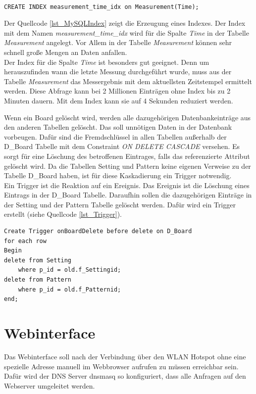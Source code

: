 \begin{lstlisting}[caption={MySQL Index},label=lst_MySQLIndex]

CREATE INDEX measurement_time_idx on Measurement(Time);

\end{lstlisting}


Der Quellcode \ref{lst_MySQLIndex} zeigt die Erzeugung eines Indexes. Der Index mit dem Namen \textit{measurement\_time\_idx} wird für die Spalte \textit{Time} in der Tabelle \textit{Measurement} angelegt. Vor Allem in der Tabelle \textit{Measurement} können sehr schnell große Mengen an Daten anfallen.\\
Der Index für die Spalte \textit{Time} ist besonders gut geeignet. Denn um herauszufinden wann die letzte Messung durchgeführt wurde, muss aus der Tabelle \textit{Measurement} das Messergebnis mit dem aktuellsten Zeitstempel ermittelt werden. Diese Abfrage kann bei 2 Millionen Einträgen ohne Index bis zu  2 Minuten dauern. Mit dem Index kann sie auf 4 Sekunden reduziert werden.\ 

Wenn ein Board gelöscht wird, werden alle dazugehörigen Datenbankeinträge aus den anderen Tabellen gelöscht. Das soll unnötigen Daten in der Datenbank vorbeugen. Dafür sind die Fremdschlüssel in allen Tabellen außerhalb der D\_Board Tabelle mit dem Constraint \textit{ON DELETE CASCADE} versehen. Es sorgt für eine Löschung des betroffenen Eintrages, falls das referenzierte Attribut gelöscht wird. Da die Tabellen Setting und Pattern keine eigenen Verweise zu der Tabelle D\_Board haben, ist für diese Kaskadierung ein Trigger notwendig. \\
Ein Trigger ist die Reaktion auf ein Ereignis. Das Ereignis ist die Löschung eines Eintrags in der D\_Board Tabelle. Daraufhin sollen die dazugehörigen Einträge in der Setting und der Pattern Tabelle gelöscht werden. Dafür wird ein Trigger erstellt (siehe Quellcode \ref{lst_Trigger}).\\

\begin{lstlisting}[caption={onBoardDelete Trigger},label=lst_Trigger]
Create Trigger onBoardDelete before delete on D_Board 
for each row 
Begin 
delete from Setting 
	where p_id = old.f_Settingid;
delete from Pattern 
	where p_id = old.f_Patternid;
end;
\end{lstlisting}



\newpage
\section{Webinterface}
Das Webinterface soll nach der Verbindung über den WLAN Hotspot ohne eine spezielle Adresse manuell im Webbrowser aufrufen zu müssen erreichbar sein. Dafür wird der DNS Server dnsmasq so konfiguriert, dass alle Anfragen auf den Webserver umgeleitet werden.

